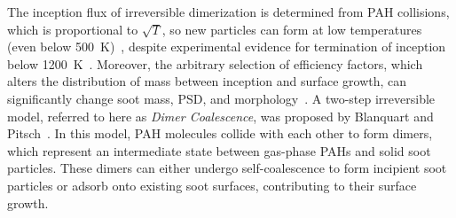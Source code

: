 The inception flux of irreversible dimerization is determined from PAH collisions, which is proportional to $\sqrt{T}$, so new particles can form at low temperatures (even below 500~K)~\citep{naseri2022simulating}, despite experimental evidence for termination of inception below 1200~K~\citep{sanchez2012polycyclic, cho2016synthesis}. Moreover, the arbitrary selection of efficiency factors, which alters the distribution of mass between inception and surface growth, can significantly change soot mass, PSD, and morphology~\citep{saffaripour2014experimental}.  A two-step irreversible model, referred to here as \textit{Dimer Coalescence}, was proposed by Blanquart and Pitsch~\citep{blanquart2009analyzing}. In this model, PAH molecules collide with each other to form dimers, which represent an intermediate state between gas-phase PAHs and solid soot particles. These dimers can either undergo self-coalescence to form incipient soot particles or adsorb onto existing soot surfaces, contributing to their surface growth.








